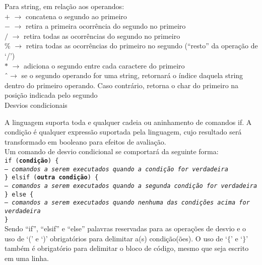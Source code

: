 \documentclass[12pt,a4paper]{article}
\def\emph#1{\textbf{#1}} %
\begin{document}
Para string, em relação aos operandos:\\[0.2cm]
$+$ $\rightarrow$ concatena o segundo ao primeiro\\
$-$ $\rightarrow$ retira a primeira ocorrência do segundo no primeiro\\
$/$ $\rightarrow$ retira todas as ocorrências do segundo no primeiro\\
\% $\rightarrow$ retira todas as ocorrências do primeiro no segundo (``resto'' da operação de `/')\\
$*$ $\rightarrow$ adiciona o segundo entre cada caractere do primeiro\\
\^ \ $\rightarrow$ se o segundo operando for uma string, retornará o índice daquela string dentro do primeiro operando. Caso contrário, retorna o char do primeiro na posição indicada pelo segundo\\

\hypertarget{label4}{\Large{Desvios condicionais}}\\[0.3cm]
\normalsize

A linguagem suporta toda e qualquer cadeia ou aninhamento de comandos if. A condição é qualquer expressão suportada pela linguagem, cujo resultado será transformado em booleano para efeitos de avaliação.\\

Um comando de desvio condicional se comportará da seguinte forma: \\

\noindent\texttt{if (\emph{condição}) \{\\
\indent\textit{-- comandos a serem executados quando a condição for verdadeira} \\
\} elsif (\emph{outra condição}) \{\\
\indent\textit{-- comandos a serem executados quando a segunda condição for verdadeira} \\
\} else \{\\
\indent\textit{-- comandos a serem executados quando nenhuma das condições acima for verdadeira} \\
\}}\\

Sendo ``if'', ``elsif'' e ``else'' palavras reservadas para as operações de desvio e o uso de `(' e `)' obrigatórios para delimitar a(s) condição(ões). O uso de `$\{$' e `$\}$' também é obrigatório para delimitar o bloco de código, mesmo que seja escrito em uma linha.\\

\end{document}
